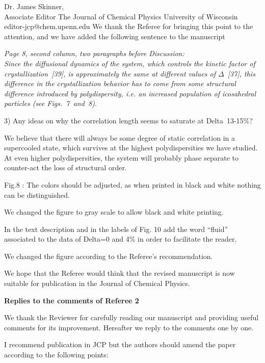 \documentclass[a4paper, rebuttal, parskip=true, firsthead=false, fromemail=false, foldmarks=false]{scrlttr2}
\begin{document}
\begin{letter}{Dr. James Skinner,\\Associate Editor
The Journal of Chemical Physics
University of Wisconsin\\
editor-jcp@chem.upenn.edu }
We thank the Referee for bringing this point to the attention, and we have added the following sentence to the manuscript

{\it Page 8, second column, two paragraphs before Discussion:\\
Since the diffusional dynamics of the
system, which controls the kinetic factor of crystallization~[39], 
is approximately the same at different values of $\Delta$~[37], this difference in the crystallization behavior has to come from
some structural difference introduced by polydispersity, i.e. an increased population of icosahedral particles (see Figs.~7~and~8).}


\begin{quotationi}
3) Any ideas on why the correlation length seems to saturate at Delta~13-15\%?
\end{quotationi}

We believe that there will always be some degree of static correlation in a supercooled state, which
survives at the highest polydispersities we have studied. At even higher polydispersities, the system
will probably phase separate to counter-act the loss of structural order.


\begin{quotationi}
Fig.8 : The colors should be adjusted, as when printed in black and white nothing can be distinguished.
\end{quotationi}
We changed the figure to gray scale to allow black and white printing.

\begin{quotationi}
In the text description and in the labels of Fig. 10 add the word ``fluid'' associated to the data of Delta=0 and 4\% in order to facilitate the reader.
\end{quotationi}
We changed the figure according to the Referee's recommendation.

We hope that the Referee would think that the revised manuscript is now suitable for publication in the Journal of Chemical Physics. 

\clearpage

\textsf{\textbf{Replies to the comments of Referee 2}}

We thank the Reviewer for carefully reading our manuscript and providing useful comments for its improvement. 
Hereafter we reply to the comments one by one.

\begin{quotationi}

I recommend publication in JCP but the authors should amend the paper
according to the following points:


\end{quotationi}
\end{letter}
\end{document}
